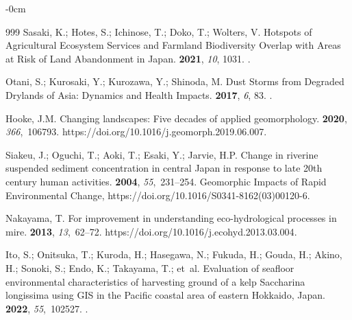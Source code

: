 \documentclass[land,article,accept,pdftex,moreauthors]{Definitions/mdpi}
\begin{document}
\begin{adjustwidth}{-\extralength}{0cm}
\begin{thebibliography}{999}
Sasaki, K.; Hotes, S.; Ichinose, T.; Doko, T.; Wolters, V.
\newblock Hotspots of Agricultural Ecosystem Services and Farmland Biodiversity
  Overlap with Areas at Risk of Land Abandonment in Japan.
 {\bf 2021}, {\em 10}, 1031.
.

Otani, S.; Kurosaki, Y.; Kurozawa, Y.; Shinoda, M.
\newblock Dust Storms from Degraded Drylands of Asia: Dynamics and Health
  Impacts.
 {\bf 2017}, {\em 6}, 83.
.

Hooke, J.M.
\newblock Changing landscapes: Five decades of applied geomorphology.
 {\bf 2020}, {\em 366},~106793.
  {{https://doi.org/10.1016/j.geomorph.2019.06.007}}. 

Siakeu, J.; Oguchi, T.; Aoki, T.; Esaki, Y.; Jarvie, H.P.
\newblock Change in riverine suspended sediment concentration in central Japan
  in response to late 20th century human activities.
 {\bf 2004}, {\em 55},~231--254.
\newblock Geomorphic Impacts of Rapid Environmental Change,
  {{https://doi.org/10.1016/S0341-8162(03)00120-6}}.

Nakayama, T.
\newblock For improvement in understanding eco-hydrological processes in mire.
 {\bf 2013}, {\em 13},~62--72.
  {{https://doi.org/10.1016/j.ecohyd.2013.03.004}}.

Ito, S.; Onitsuka, T.; Kuroda, H.; Hasegawa, N.; Fukuda, H.; Gouda, H.; Akino,
  H.; Sonoki, S.; Endo, K.; Takayama, T.;  et~al.
\newblock Evaluation of seafloor environmental characteristics of harvesting
  ground of a kelp Saccharina longissima using GIS in the Pacific coastal area
  of eastern Hokkaido, Japan.
 {\bf 2022}, {\em
  55},~102527.
.


\end{thebibliography}
\end{adjustwidth}
\end{document}
